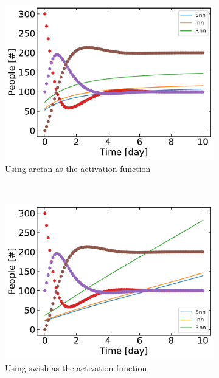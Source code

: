 	\begin{figure}[H]
	\centering
	\begin{subfigure}{0.5\textwidth}
		\centering
		\includegraphics[width=\linewidth]{result/Resultater_supervised/arctan_100_1000_0001.pdf}
		\caption{Using arctan as the activation function}
	\end{subfigure}%
	~ 
	\begin{subfigure}{0.5\textwidth}
		\centering
		\includegraphics[width=\linewidth]{result/Resultater_supervised/swish_100_1000_0001.pdf}
		\caption{Using swish as the activation function}
	\end{subfigure}
	\begin{subfigure}{0.5\textwidth}
		\centering

\end{subfigure}
\end{figure}
